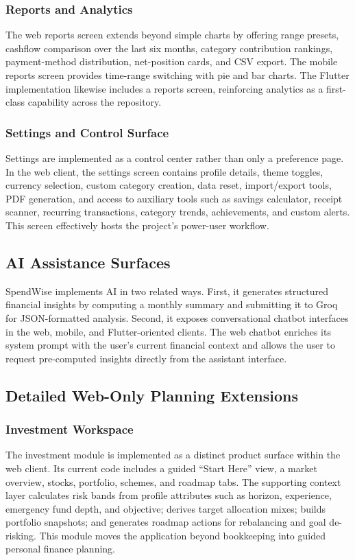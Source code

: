 \documentclass[conference]{IEEEtran}
\begin{document}
\subsubsection{Reports and Analytics}
The web reports screen extends beyond simple charts by offering range presets, cashflow comparison over the last six months, category contribution rankings, payment-method distribution, net-position cards, and CSV export. The mobile reports screen provides time-range switching with pie and bar charts. The Flutter implementation likewise includes a reports screen, reinforcing analytics as a first-class capability across the repository.

\subsubsection{Settings and Control Surface}
Settings are implemented as a control center rather than only a preference page. In the web client, the settings screen contains profile details, theme toggles, currency selection, custom category creation, data reset, import/export tools, PDF generation, and access to auxiliary tools such as savings calculator, receipt scanner, recurring transactions, category trends, achievements, and custom alerts. This screen effectively hosts the project's power-user workflow.

\subsection{AI Assistance Surfaces}
SpendWise implements AI in two related ways. First, it generates structured financial insights by computing a monthly summary and submitting it to Groq for JSON-formatted analysis. Second, it exposes conversational chatbot interfaces in the web, mobile, and Flutter-oriented clients. The web chatbot enriches its system prompt with the user's current financial context and allows the user to request pre-computed insights directly from the assistant interface.

\subsection{Detailed Web-Only Planning Extensions}
\subsubsection{Investment Workspace}
The investment module is implemented as a distinct product surface within the web client. Its current code includes a guided ``Start Here'' view, a market overview, stocks, portfolio, schemes, and roadmap tabs. The supporting context layer calculates risk bands from profile attributes such as horizon, experience, emergency fund depth, and objective; derives target allocation mixes; builds portfolio snapshots; and generates roadmap actions for rebalancing and goal de-risking. This module moves the application beyond bookkeeping into guided personal finance planning.
\end{document}
